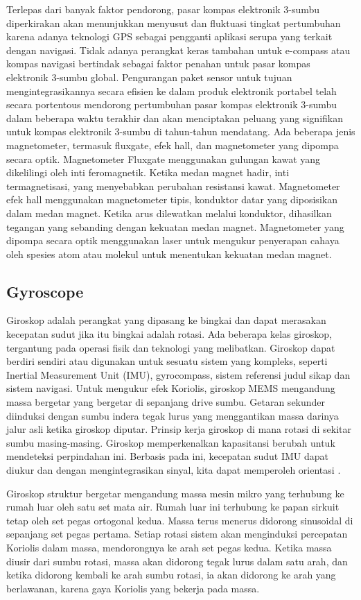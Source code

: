 Terlepas dari banyak faktor pendorong, pasar kompas elektronik 3-sumbu diperkirakan akan menunjukkan menyusut dan fluktuasi tingkat pertumbuhan karena adanya teknologi GPS sebagai 
pengganti aplikasi serupa yang terkait dengan navigasi. Tidak adanya perangkat keras tambahan untuk e-compass atau kompas navigasi bertindak sebagai faktor penahan untuk pasar kompas 
elektronik 3-sumbu global. Pengurangan paket sensor untuk tujuan mengintegrasikannya secara efisien ke dalam produk elektronik portabel telah secara portentous mendorong pertumbuhan 
pasar kompas elektronik 3-sumbu dalam beberapa waktu terakhir dan akan menciptakan peluang yang signifikan untuk kompas elektronik 3-sumbu di tahun-tahun mendatang. Ada beberapa jenis 
magnetometer, termasuk fluxgate, efek hall, dan magnetometer yang dipompa secara optik. Magnetometer Fluxgate menggunakan gulungan kawat yang dikelilingi oleh inti feromagnetik. Ketika 
medan magnet hadir, inti termagnetisasi, yang menyebabkan perubahan resistansi kawat. Magnetometer efek hall menggunakan magnetometer tipis, konduktor datar yang diposisikan dalam medan 
magnet. Ketika arus dilewatkan melalui konduktor, dihasilkan tegangan yang sebanding dengan kekuatan medan magnet. Magnetometer yang dipompa secara optik menggunakan laser untuk mengukur 
penyerapan cahaya oleh spesies atom atau molekul untuk menentukan kekuatan medan magnet.

\subsection{Gyroscope}
Giroskop adalah perangkat yang dipasang ke bingkai dan dapat merasakan kecepatan sudut jika itu bingkai adalah rotasi. Ada beberapa kelas giroskop, tergantung pada operasi fisik dan 
teknologi yang melibatkan. Giroskop dapat berdiri sendiri atau digunakan untuk sesuatu sistem yang kompleks, seperti Inertial Measurement Unit (IMU), gyrocompass, sistem referensi judul 
sikap dan sistem navigasi. Untuk mengukur efek Koriolis, giroskop MEMS mengandung massa bergetar yang bergetar di sepanjang drive sumbu. Getaran sekunder diinduksi 
dengan sumbu indera tegak lurus yang menggantikan massa darinya jalur asli ketika giroskop diputar. Prinsip kerja giroskop di mana rotasi di sekitar sumbu masing-masing. 
Giroskop memperkenalkan kapasitansi berubah untuk mendeteksi perpindahan ini. Berbasis pada ini, kecepatan sudut IMU dapat diukur dan dengan mengintegrasikan sinyal, kita dapat memperoleh
orientasi \parencite{Passaro2017}.

Giroskop struktur bergetar mengandung massa mesin mikro yang terhubung ke rumah luar oleh satu set mata air. Rumah luar ini terhubung ke papan sirkuit tetap oleh set pegas ortogonal 
kedua. Massa terus menerus didorong sinusoidal di sepanjang set pegas pertama. Setiap rotasi sistem akan menginduksi percepatan Koriolis dalam massa, mendorongnya ke arah set pegas 
kedua. Ketika massa diusir dari sumbu rotasi, massa akan didorong tegak lurus dalam satu arah, dan ketika didorong kembali ke arah sumbu rotasi, ia akan didorong ke arah yang 
berlawanan, karena gaya Koriolis yang bekerja pada massa.


